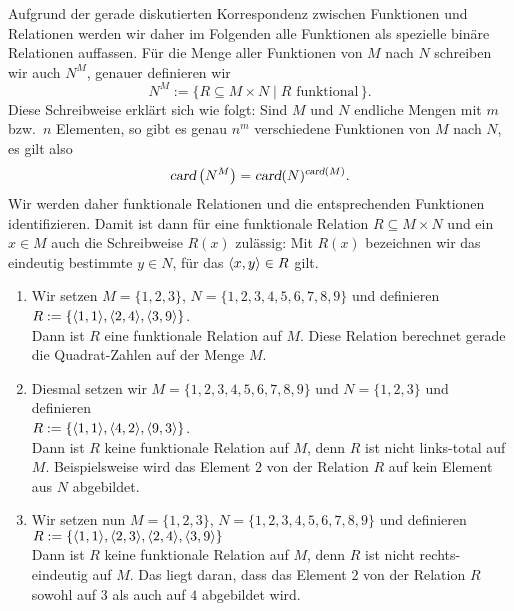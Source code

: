 Aufgrund der gerade diskutierten Korrespondenz zwischen Funktionen und Relationen
werden wir daher im Folgenden alle Funktionen als spezielle bin\"{a}re Relationen auffassen.
F\"{u}r die Menge aller Funktionen von $M$ nach $N$ schreiben wir auch $N^M$, genauer
definieren wir
\[ N^M := \{ R \subseteq M \times N \mid \mbox{$R$ funktional}\, \}. \]
Diese Schreibweise erkl\"{a}rt sich wie folgt: Sind $M$ und $N$ endliche Mengen mit $m$
bzw.~$n$ Elementen, so gibt es genau $n^m$ verschiedene Funktionen von $M$ nach $N$, es
gilt also
\[ \textsl{card}\left(N^M\right) = \textsl{card}(N)^{\textsl{card}(M)}. \]
Wir werden daher funktionale Relationen und die entsprechenden Funktionen identifizieren.
Damit ist dann f\"{u}r eine funktionale Relation $R \subseteq M \times N$ und ein $x \in M$
auch die Schreibweise $R(x)$ zul\"{a}ssig: Mit $R(x)$ bezeichnen wir das eindeutig bestimmte $y \in N$,
f\"{u}r das $\pair(x,y) \in R$ gilt.

\examples
\begin{enumerate}
\item Wir setzen $M = \{1,2,3\}$, $N = \{1,2,3,4,5,6,7,8,9\}$ und definieren \\[0.2cm]
      \hspace*{1.3cm} $R := \{ \pair(1,1),\pair(2,4),\pair(3,9) \}$. \\[0.2cm]
      Dann ist $R$ eine funktionale Relation auf $M$.  Diese Relation berechnet
      gerade die Quadrat-Zahlen auf der Menge $M$.
\item Diesmal setzen wir $M = \{1,2,3,4,5,6,7,8,9\}$ und $N = \{1,2,3\}$ und definieren \\[0.2cm]
      \hspace*{1.3cm} $R := \{ \pair(1,1),\pair(4,2),\pair(9,3) \}$. \\[0.2cm]
      Dann ist $R$ keine funktionale Relation auf $M$, denn $R$ ist nicht links-total auf
      $M$.  Beispielsweise wird das Element $2$ von der Relation $R$ auf kein Element aus 
      $N$ abgebildet.
\item Wir setzen nun  $M = \{1,2,3\}$, $N = \{1,2,3,4,5,6,7,8,9\}$ und definieren \\[0.2cm]
      \hspace*{1.3cm} $R := \{ \pair(1,1),\pair(2,3),\pair(2,4),\pair(3,9) \}$ \\[0.2cm]
      Dann ist $R$ keine funktionale Relation auf $M$, denn $R$ ist nicht rechts-eindeutig auf
      $M$.  Das liegt daran, dass das Element $2$ von der Relation $R$ sowohl auf $3$ als
      auch auf $4$ abgebildet wird. \eox
\end{enumerate}

